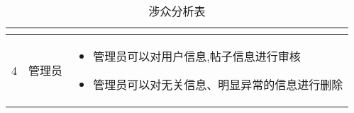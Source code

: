 \begin{table}[htbp]
\begin{center}
\begin{tabular}{|c|c|p{11cm}|}
\begin{itemize}
    \end{itemize} \\ \hline  
    4 & 管理员 &
    

\begin{itemize}

    \item 管理员可以对用户信息,帖子信息进行审核 
    \item 管理员可以对无关信息、明显异常的信息进行删除
 
\end{itemize}
    \\ \hline  
    \end{tabular}  
    \end{center}  
    \caption{涉众分析表}  
    \end{table}